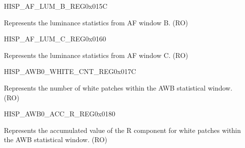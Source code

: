 \begin{register}{H}{ISP\_AF\_LUM\_B\_REG}{0x015C}\label{regdesc:ISPAFLUMBREG}
%
%
\regnewline%
\begin{regdesc}\begin{reglist}
\label{fielddesc:ISPAFLUMB}\item [ISP\_AF\_LUMB] Represents the luminance statistics from AF window B. (RO)
\end{reglist}\end{regdesc}
\end{register}


\begin{register}{H}{ISP\_AF\_LUM\_C\_REG}{0x0160}\label{regdesc:ISPAFLUMCREG}
%
%
\regnewline%
\begin{regdesc}\begin{reglist}
\label{fielddesc:ISPAFLUMC}\item [ISP\_AF\_LUMC] Represents the luminance statistics from AF window C. (RO)
\end{reglist}\end{regdesc}
\end{register}


\begin{register}{H}{ISP\_AWB0\_WHITE\_CNT\_REG}{0x017C}\label{regdesc:ISPAWB0WHITECNTREG}
%
%
\regnewline%
\begin{regdesc}\begin{reglist}
\label{fielddesc:ISPAWB0WHITECNT}\item [ISP\_AWB0\_WHITE\_CNT] Represents the number of white patches within the AWB statistical window. (RO)
\end{reglist}\end{regdesc}
\end{register}


\begin{register}{H}{ISP\_AWB0\_ACC\_R\_REG}{0x0180}\label{regdesc:ISPAWB0ACCRREG}
%
\regnewline%
\begin{regdesc}\begin{reglist}
\label{fielddesc:ISPAWB0ACCR}\item [ISP\_AWB0\_ACC\_R] Represents the accumulated value of the R component for white patches within the AWB statistical window. (RO)
\end{reglist}\end{regdesc}
\end{register}


